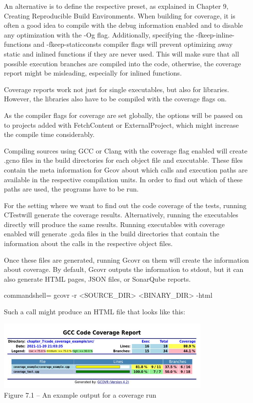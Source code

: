 An alternative is to define the respective preset, as explained in Chapter 9, Creating Reproducible Build Environments. When building for coverage, it is often a good idea to compile with the debug information enabled and to disable any optimization with the -Og flag. Additionally, specifying the -fkeep-inline-functions and -fkeep-staticconsts compiler flags will prevent optimizing away static and inlined functions if they are never used. This will make sure that all possible execution branches are compiled into the code, otherwise, the coverage report might be misleading, especially for inlined functions. 

Coverage reports work not just for single executables, but also for libraries. However, the libraries also have to be compiled with the coverage flags on.

As the compiler flags for coverage are set globally, the options will be passed on to projects added with FetchContent or ExternalProject, which might increase the compile time considerably.

Compiling sources using GCC or Clang with the coverage flag enabled will create .gcno files in the build directories for each object file and executable. These files contain the meta information for Gcov about which calls and execution paths are available in the respective compilation units. In order to find out which of these paths are used, the programs have to be run.

For the setting where we want to find out the code coverage of the tests, running CTestwill generate the coverage results. Alternatively, running the executables directly will produce the same results. Running executables with coverage enabled will generate .gcda files in the build directories that contain the information about the calls in the respective object files.

Once these files are generated, running Gcovr on them will create the information about coverage. By default, Gcovr outputs the information to stdout, but it can also generate HTML pages, JSON files, or SonarQube reports.

\begin{tcblisting}{commandshell={}}
gcovr -r <SOURCE_DIR> <BINARY_DIR> -html
\end{tcblisting}

Such a call might produce an HTML file that looks like this:

\begin{center}
\includegraphics[width=0.8\textwidth]{content/2/chapter7/images/1.jpg}\\
Figure 7.1 – An example output for a coverage run
\end{center}

